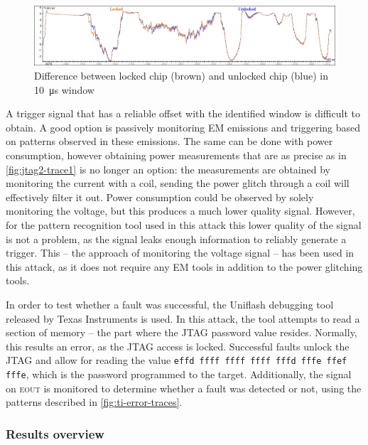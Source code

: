 \documentclass[10pt]{article}
\newcommand{\errorpin}{\textsc{eout}\xspace}
\begin{document}
    \begin{figure}[H]
      \centering
      \includegraphics[width=\textwidth]{../plots/tms57-trace2.png}
      \caption{Difference between locked chip (brown) and unlocked chip (blue) in \SI{10}{\micro\second} window}
      \label{fig:jtag2-trace2}
    \end{figure}

    A trigger signal that has a reliable offset with the identified window is difficult to obtain. 
    A good option is passively monitoring EM emissions and triggering based on patterns observed in these emissions. The same can be done with power consumption, however obtaining power measurements that are as precise as in \autoref{fig:jtag2-trace1} is no longer an option: the measurements are obtained by monitoring the current with a coil, sending the power glitch through a coil will effectively filter it out. Power consumption could be observed by solely monitoring the voltage, but this produces a much lower quality signal.
    However, for the pattern recognition tool used in this attack this lower quality of the signal is not a problem, as the signal leaks enough information to reliably generate a trigger. This -- the approach of monitoring the voltage signal -- has been used in this attack, as it does not require any EM tools in addition to the power glitching tools.

    In order to test whether a fault was successful, the Uniflash debugging tool released by Texas Instruments is used. In this attack, the tool attempts to read a section of memory -- the part where the JTAG password value resides. Normally, this results an error, as the JTAG access is locked. Successful faults unlock the JTAG and allow for reading the value \texttt{effd ffff ffff ffff fffd fffe ffef fffe}, which is the password programmed to the target. Additionally, the signal on \errorpin is monitored to determine whether a fault was detected or not, using the patterns described in \autoref{fig:ti-error-traces}.


  \subsubsection{Results overview}
\end{document}
